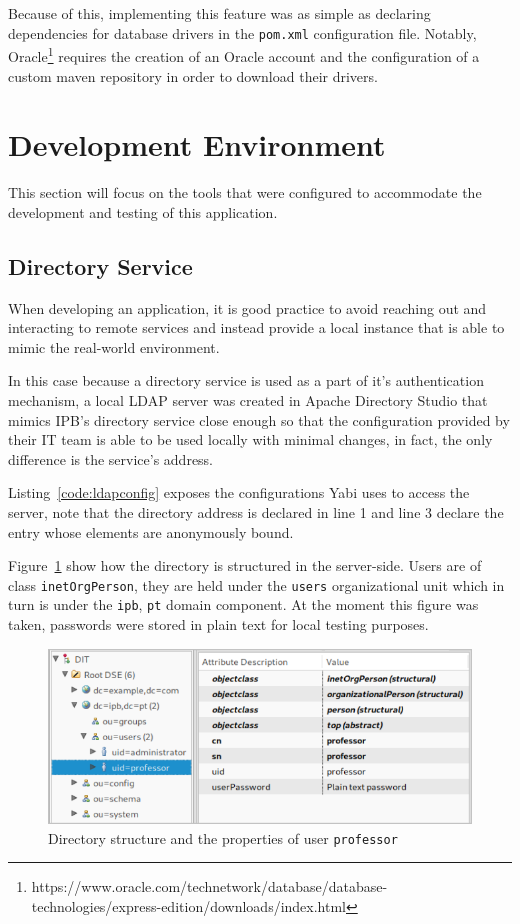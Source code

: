 Because of this, implementing this feature was as simple as declaring dependencies for database drivers in the \texttt{pom.xml} configuration file. Notably, Oracle\footnote{https://www.oracle.com/technetwork/database/database-technologies/express-edition/downloads/index.html} requires the creation of an Oracle account and the configuration of a custom maven repository in order to download their drivers.

\section{Development Environment}\label{cha:implementation:sec:development}
This section will focus on the tools that were configured to accommodate the development and testing of this application.
\subsection{Directory Service}
When developing an application, it is good practice to avoid reaching out and interacting to remote services and instead provide a local instance that is able to mimic the real-world environment.

In this case because a directory service is used as a part of it's authentication mechanism, a local \gls{LDAP} server was created in Apache Directory Studio that mimics \gls{IPB}'s directory service close enough so that the configuration provided by their \gls{IT} team is able to be used locally with minimal changes, in fact, the only difference is the service's address.

Listing~\ref{code:ldapconfig} exposes the configurations \gls{Yabi} uses to access the server, note that the directory address is declared in line 1 and line 3 declare the entry whose elements are anonymously bound.



Figure~\ref{fig:adsconfig} show how the directory is structured in the server-side. Users are of class \texttt{inetOrgPerson}, they are held under the \texttt{users} organizational unit which in turn is under the \texttt{ipb}, \texttt{pt} domain component. At the moment this figure was taken, passwords were stored in plain text for local testing purposes.

\begin{figure}
  \centering
  \includegraphics[width=.8\textwidth]{images/screenshots/ldap-directory}
  \caption{Directory structure and the properties of user \texttt{professor}}\label{fig:adsconfig}
\end{figure}

